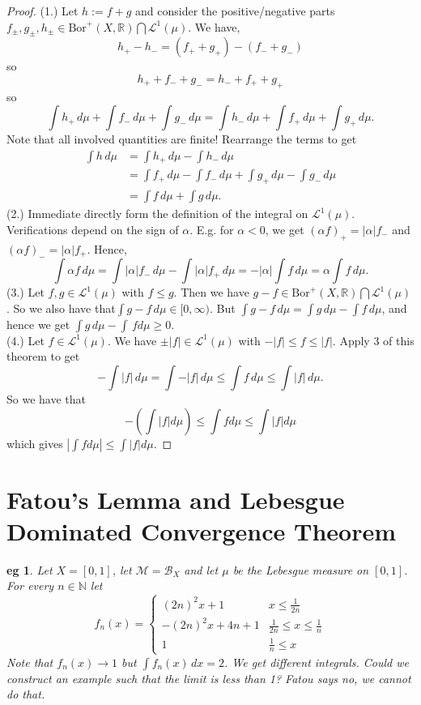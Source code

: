 \documentclass[letterpaper, 12pt]{article}
\newcommand{\fin}{\qquad \quad \hfill \framebox[1.75mm][l]{\,}}
\newcommand{\cL}{\mathcal{L}}
\newcommand{\cB}{\mathcal{B}}
\newcommand{\cM}{\mathcal{M}}
\newcommand{\bR}{\mathbb{R}}
\newcommand{\bN}{\mathbb{N}}
\newcommand{\Bor}{\mathrm{Bor}}
\providecommand{\abs}[1]{\left\lvert#1\right\rvert}
\theoremstyle{stdthm}
\theoremstyle{stddef}
\newtheorem{eg}[thm]{eg} %
\theoremstyle{stdnonum}
\theoremstyle{stdqands}
\theoremstyle{stdbold}
\begin{document}
\begin{proof}
(1.) Let $h := f + g$ and consider the positive/negative parts$f_{\pm},g_{\pm}, h_{\pm} \in \Bor^+(X,\bR) \bigcap \cL^1(\mu)$. We have, 
\[
h_+ - h_{-} = (f_+ + g_+) - (f_{-} + g_{-})
\]
so
\[
h_+ + f_{-} + g_{-} = h_{-} + f_{+} + g_{+}
\]
so
\[
\int h_+ \, d\mu + \int f_{-} \, d\mu + \int g_{-} \, d\mu = \int h_{-} \, d\mu + \int f_{+} \, d\mu  + \int g_{+} \, d\mu.
\]
Note that all involved quantities are finite! Rearrange the terms to get 
\begin{align*}
\int h \, d\mu &= \int h_+ \, d\mu - \int h_{-}\, d\mu\\
&= \int f_+ \, d\mu - \int f_{-} \, d\mu + \int g_+ \, d\mu - \int g_{-}\, d\mu\\
&= \int f\, d\mu + \int g\, d\mu.
\end{align*}
(2.) Immediate directly form the definition of the integral on $\cL^1(\mu)$. Verifications depend on the sign of $\alpha$. E.g. for $\alpha < 0$, we get $(\alpha f)_{+} = |\alpha| f_{-}$ and $(\alpha f)_{-} = |\alpha| f_{+}$. Hence, 
\[
\int \alpha f \, d\mu = \int \abs{\alpha}f_- \, d\mu - \int \abs{\alpha} f_+ \, d\mu = -|\alpha| \int f \, d\mu = \alpha \int f \, d\mu.
\]
(3.) Let $f,g \in \cL^1(\mu)$ with  $f\leq g$. Then we have $g -f \in \Bor^+(X,\bR)\bigcap \cL^1(\mu)$. So we also have that$\int g - f \, d \mu \in [0,\infty)$. But $\int g - f \, d\mu = \int g \, d\mu - \int f \, d\mu$, and hence we get $\int g \, d\mu - \int \, f d\mu \geq 0$. \\

\noindent (4.) Let $f\in \cL^1(\mu)$. We have  $\pm|f|\in \cL^1(\mu)$ with $-|f| \leq f \leq |f|$. Apply 3 of this theorem to get 
\[
-\int |f| \, d\mu = \int - |f| \, d\mu \leq \int f \, d\mu \leq \int |f| \, d\mu.
\]
So we have that
\[
-\left( \int |f| d\mu \right) \leq \int f d\mu \leq \int |f| d\mu \]
which gives $\abs{\int f d\mu } \leq \int |f| d\mu$. 
\end{proof}

\newpage

\section{Fatou's Lemma and Lebesgue Dominated Convergence Theorem}

\begin{eg}
Let $X = [0,1]$, let $\cM = \cB_X$ and let $\mu$ be the Lebesgue measure on $[0,1]$. For every $n\in \bN$ let 
\[ f_n(x) = 
\begin{cases}
(2n)^2x+1 & x \leq \frac{1}{2n}\\
-(2n)^2x+4n+1 & \frac{1}{2n} \leq x \leq \frac{1}{n}\\
1 & \frac{1}{n} \leq x
\end{cases}
\]
Note that $f_n(x) \rightarrow 1$ but $\int f_n(x)\, dx = 2$. We get different integrals.  Could we construct an example such that the limit is less than 1? Fatou says no, we cannot do that. 
\end{eg}
\end{document}
